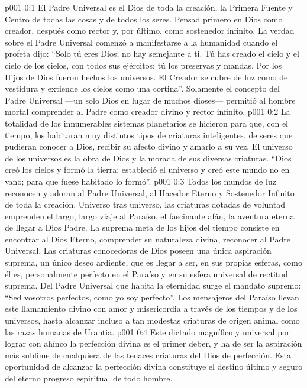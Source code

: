 \author{Consejero divino}
\vs p001 0:1 El Padre Universal es el Dios de toda la creación, la Primera Fuente y Centro de todas las cosas y de todos los seres. Pensad primero en Dios como creador, después como rector y, por último, como sostenedor infinito. La verdad sobre el Padre Universal comenzó a manifestarse a la humanidad cuando el profeta dijo: “Solo tú eres Dios; no hay semejante a ti. Tú has creado el cielo y el cielo de los cielos, con todos sus ejércitos; tú los preservas y mandas. Por los Hijos de Dios fueron hechos los universos. El Creador se cubre de luz como de vestidura y extiende los cielos como una cortina”. Solamente el concepto del Padre Universal ---un solo Dios en lugar de muchos dioses--- permitió al hombre mortal comprender al Padre como creador divino y rector infinito.
\vs p001 0:2 La totalidad de los innumerables sistemas planetarios se hicieron para que, con el tiempo, los habitaran muy distintos tipos de criaturas inteligentes, de seres que pudieran conocer a Dios, recibir su afecto divino y amarlo a su vez. El universo de los universos es la obra de Dios y la morada de sus diversas criaturas. “Dios creó los cielos y formó la tierra; estableció el universo y creó este mundo no en vano; para que fuese habitado lo formó”.
\vs p001 0:3 Todos los mundos de luz reconocen y adoran al Padre Universal, al Hacedor Eterno y Sostenedor Infinito de toda la creación. Universo tras universo, las criaturas dotadas de voluntad emprenden el largo, largo viaje al Paraíso, el fascinante afán, la aventura eterna de llegar a Dios Padre. La suprema meta de los hijos del tiempo consiste en encontrar al Dios Eterno, comprender su naturaleza divina, reconocer al Padre Universal. Las criaturas conocedoras de Dios poseen una única aspiración suprema, un único deseo ardiente, que es llegar a ser, en sus propias esferas, como él es, personalmente perfecto en el Paraíso y en su esfera universal de rectitud suprema. Del Padre Universal que habita la eternidad surge el mandato supremo: “Sed vosotros perfectos, como yo soy perfecto”. Los mensajeros del Paraíso llevan este llamamiento divino con amor y misericordia a través de los tiempos y de los universos, hasta alcanzar incluso a tan modestas criaturas de origen animal como las razas humanas de Urantia.
\vs p001 0:4 Este dictado magnífico y universal por lograr con ahínco la perfección divina es el primer deber, y ha de ser la aspiración más sublime de cualquiera de las tenaces criaturas del Dios de perfección. Esta oportunidad de alcanzar la perfección divina constituye el destino último y seguro del eterno progreso espiritual de todo hombre.
